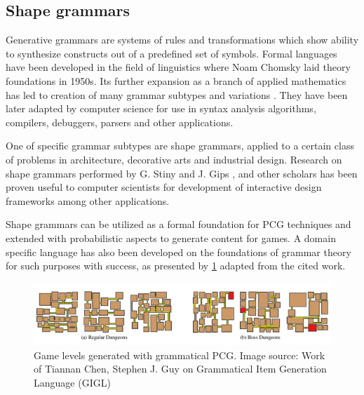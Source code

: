 \documentclass[12pt]{report}
\begin{document}
\subsection{Shape grammars}

Generative grammars are systems of rules and transformations which show ability to synthesize constructs out of a predefined set of symbols. Formal languages have been developed in the field of linguistics where Noam Chomsky laid theory foundations in 1950s. Its further expansion as a branch of applied mathematics has led to creation of many grammar subtypes and variations \autocite{Harrison:1978:IFL:578595}. They have been later adapted by computer science for use in syntax analysis algorithms, compilers, debuggers, parsers and other applications. 

One of specific grammar subtypes are shape grammars, applied to a certain class of problems in architecture, decorative arts and industrial design. Research on shape grammars performed by G. Stiny and J. Gips \autocite{Stiny1980IntroductionTS}, \autocite{stiny1971shape} and other scholars has been proven useful to computer scientists for development of interactive design frameworks \autocite{Dang:2015:IDP:2816795.2818069} among other applications. 

Shape grammars can be utilized as a formal foundation for PCG techniques and extended with probabilistic aspects \autocite{sportelli2014} to generate content for games. A domain specific language has also been developed on the foundations of grammar theory \autocite{Chen2018GIGLAD} for such purposes with success, as presented by \cref{fig:gigladomainspecificlanguagefor201904231555971576} adapted from the cited work. 

\begin{figure}[H]
	\centering
	\includegraphics[width=\textwidth]{images/GIGL_A_Domain_Specific_Language_for_2019_04_23_1555971576}
	\caption{Game levels generated with grammatical PCG. Image source: Work of Tiannan Chen, Stephen J. Guy on Grammatical Item Generation Language (GIGL) \autocite{Chen2018GIGLAD} }
	\label{fig:gigladomainspecificlanguagefor201904231555971576}
\end{figure}
\end{document}
